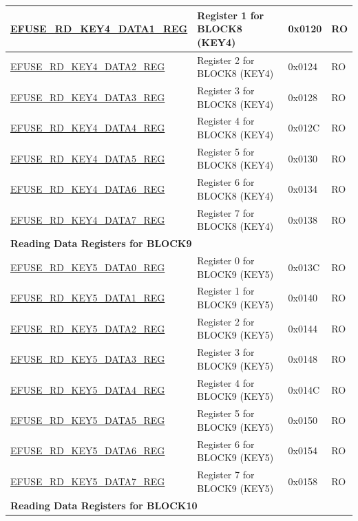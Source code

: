\begin{longtable}{ | p{7cm} | p{7.2cm} | p{1.3cm} | p{1cm} | }
\hyperref[regdesc:EFUSERDKEY4DATANREG]{EFUSE\_RD\_KEY4\_DATA1\_REG} & Register 1 for BLOCK8 (KEY4) & 0x0120 & RO \\ \hline
\hyperref[regdesc:EFUSERDKEY4DATANREG]{EFUSE\_RD\_KEY4\_DATA2\_REG} & Register 2 for BLOCK8 (KEY4) & 0x0124 & RO \\ \hline
\hyperref[regdesc:EFUSERDKEY4DATANREG]{EFUSE\_RD\_KEY4\_DATA3\_REG} & Register 3 for BLOCK8 (KEY4) & 0x0128 & RO \\ \hline
\hyperref[regdesc:EFUSERDKEY4DATANREG]{EFUSE\_RD\_KEY4\_DATA4\_REG} & Register 4 for BLOCK8 (KEY4) & 0x012C & RO \\ \hline
\hyperref[regdesc:EFUSERDKEY4DATANREG]{EFUSE\_RD\_KEY4\_DATA5\_REG} & Register 5 for BLOCK8 (KEY4) & 0x0130 & RO \\ \hline
\hyperref[regdesc:EFUSERDKEY4DATANREG]{EFUSE\_RD\_KEY4\_DATA6\_REG} & Register 6 for BLOCK8 (KEY4) & 0x0134 & RO \\ \hline
\hyperref[regdesc:EFUSERDKEY4DATANREG]{EFUSE\_RD\_KEY4\_DATA7\_REG} & Register 7 for BLOCK8 (KEY4) & 0x0138 & RO \\ \hline
\multicolumn{4}{|l|}{\textbf{Reading Data Registers for BLOCK9}} \\ \hline
\hyperref[regdesc:EFUSERDKEY5DATAMREG]{EFUSE\_RD\_KEY5\_DATA0\_REG} & Register 0 for BLOCK9 (KEY5) & 0x013C & RO \\ \hline
\hyperref[regdesc:EFUSERDKEY5DATAMREG]{EFUSE\_RD\_KEY5\_DATA1\_REG} & Register 1 for BLOCK9 (KEY5) & 0x0140 & RO \\ \hline
\hyperref[regdesc:EFUSERDKEY5DATAMREG]{EFUSE\_RD\_KEY5\_DATA2\_REG} & Register 2 for BLOCK9 (KEY5) & 0x0144 & RO \\ \hline
\hyperref[regdesc:EFUSERDKEY5DATAMREG]{EFUSE\_RD\_KEY5\_DATA3\_REG} & Register 3 for BLOCK9 (KEY5) & 0x0148 & RO \\ \hline
\hyperref[regdesc:EFUSERDKEY5DATAMREG]{EFUSE\_RD\_KEY5\_DATA4\_REG} & Register 4 for BLOCK9 (KEY5) & 0x014C & RO \\ \hline
\hyperref[regdesc:EFUSERDKEY5DATAMREG]{EFUSE\_RD\_KEY5\_DATA5\_REG} & Register 5 for BLOCK9 (KEY5) & 0x0150 & RO \\ \hline
\hyperref[regdesc:EFUSERDKEY5DATAMREG]{EFUSE\_RD\_KEY5\_DATA6\_REG} & Register 6 for BLOCK9 (KEY5) & 0x0154 & RO \\ \hline
\hyperref[regdesc:EFUSERDKEY5DATAMREG]{EFUSE\_RD\_KEY5\_DATA7\_REG} & Register 7 for BLOCK9 (KEY5) & 0x0158 & RO \\ \hline
\multicolumn{4}{|l|}{\textbf{Reading Data Registers for BLOCK10}} \\ \hline

\end{longtable}
